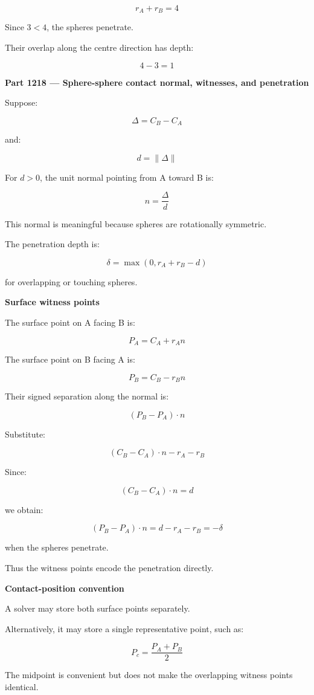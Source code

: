 \[
r_A+r_B=4
\]

Since \(3<4\), the spheres penetrate.

Their overlap along the centre direction has depth:

\[
4-3=1
\]

\textbf{Part 1218 --- Sphere-sphere contact normal, witnesses, and penetration}

Suppose:

\[
\Delta=C_B-C_A
\]

and:

\[
d=\|\Delta\|
\]

For \(d>0\), the unit normal pointing from A toward B is:

\[
\boxed{ n=\frac{\Delta}{d} }
\]

This normal is meaningful because spheres are rotationally symmetric.

The penetration depth is:

\[
\boxed{ \delta=\max(0,r_A+r_B-d) }
\]

for overlapping or touching spheres.

\textbf{Surface witness points}

The surface point on A facing B is:

\[
\boxed{ P_A=C_A+r_An }
\]

The surface point on B facing A is:

\[
\boxed{ P_B=C_B-r_Bn }
\]

Their signed separation along the normal is:

\[
(P_B-P_A)\cdot n
\]

Substitute:

\[
(C_B-C_A)\cdot n-r_A-r_B
\]

Since:

\[
(C_B-C_A)\cdot n=d
\]

we obtain:

\[
\boxed{ (P_B-P_A)\cdot n=d-r_A-r_B=-\delta }
\]

when the spheres penetrate.

Thus the witness points encode the penetration directly.

\textbf{Contact-position convention}

A solver may store both surface points separately.

Alternatively, it may store a single representative point, such as:

\[
P_c=\frac{P_A+P_B}{2}
\]

The midpoint is convenient but does not make the overlapping witness points identical.

